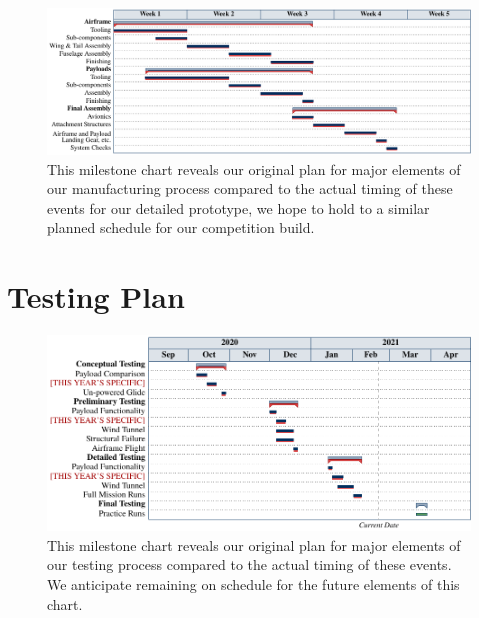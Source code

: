 \documentclass[report]{byu-aero}
\begin{document}
\begin{figure}[h!]
	\centering
	\includegraphics[]{manufacturingchart.pdf}
	\caption{This milestone chart reveals our {\color{\BYUblue}original plan} for major elements of our manufacturing process compared to the {\color{\BYUred}actual timing} of these events for our detailed prototype, we hope to hold to a similar planned schedule for our competition build.}
	\label{fig:plannedvsactualtimingmanufacturing}
\end{figure}



\section{Testing Plan} %
\label{sec:TestingPlan}


\begin{figure}[h!]
	\centering
	\includegraphics[]{testingchart.pdf}
	\caption{This milestone chart reveals our {\color{\BYUblue}original plan} for major elements of our testing process compared to the {\color{\BYUred}actual timing} of these events. We anticipate remaining on schedule for the {\color{\BYUgreen} future elements} of this chart.}
	\label{fig:plannedvsactualtimingtesting}
\end{figure}
\end{document}
